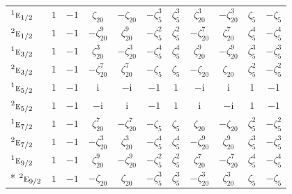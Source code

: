 \documentclass[10pt,a4paper]{article}
\makeatletter
\def\grouprule#1#2{\noalign{\marks\LTgroupmarks{\the\belowrulesep}\nobreak\vskip#1%
  \vskip\aboverulesep}\multispan\LT@cols\unskip{\leaders\hrule\@height#2\hfill\kern\z@}\cr
  \noalign{\penalty\LTrulebreak\vskip\belowrulesep\global\@lastruleclass\z@}}
\numberwithin{equation}{section}
\newcommand{\irr}[1]{\text{\normalfont\scshape #1}}
\newcommand{\conjpair}[1]{{}^{#1}}
\newcommand{\iunit}{\mathrm{i}}
\newcommand{\rootunity}[1]{\zeta_{#1}}
\makeatother
\begin{document}
{\begin{longtable}{@{}lcccccccccc@{}}
\grouprule{0pt}{\lightrulewidth}
$\conjpair{1}\irr{e}_{1/2}$ & $1$ & $-1$ & $\rootunity{20}$ & $-\rootunity{20}$ & $-\rootunity{5}^{3}$ & $\rootunity{5}^{3}$ & $\rootunity{20}^{3}$ & $-\rootunity{20}^{3}$ & $\rootunity{5}$ & $-\rootunity{5}$\\
$\conjpair{2}\irr{e}_{1/2}$ & $1$ & $-1$ & $-\rootunity{20}^{9}$ & $\rootunity{20}^{9}$ & $-\rootunity{5}^{2}$ & $\rootunity{5}^{2}$ & $-\rootunity{20}^{7}$ & $\rootunity{20}^{7}$ & $\rootunity{5}^{4}$ & $-\rootunity{5}^{4}$\\
$\conjpair{1}\irr{e}_{3/2}$ & $1$ & $-1$ & $\rootunity{20}^{3}$ & $-\rootunity{20}^{3}$ & $-\rootunity{5}^{4}$ & $\rootunity{5}^{4}$ & $\rootunity{20}^{9}$ & $-\rootunity{20}^{9}$ & $\rootunity{5}^{3}$ & $-\rootunity{5}^{3}$\\
$\conjpair{2}\irr{e}_{3/2}$ & $1$ & $-1$ & $-\rootunity{20}^{7}$ & $\rootunity{20}^{7}$ & $-\rootunity{5}$ & $\rootunity{5}$ & $-\rootunity{20}$ & $\rootunity{20}$ & $\rootunity{5}^{2}$ & $-\rootunity{5}^{2}$\\
$\conjpair{1}\irr{e}_{5/2}$ & $1$ & $-1$ & $\iunit{}$ & $-\iunit{}$ & $-1$ & $1$ & $-\iunit{}$ & $\iunit{}$ & $1$ & $-1$\\
$\conjpair{2}\irr{e}_{5/2}$ & $1$ & $-1$ & $-\iunit{}$ & $\iunit{}$ & $-1$ & $1$ & $\iunit{}$ & $-\iunit{}$ & $1$ & $-1$\\
$\conjpair{1}\irr{e}_{7/2}$ & $1$ & $-1$ & $\rootunity{20}^{7}$ & $-\rootunity{20}^{7}$ & $-\rootunity{5}$ & $\rootunity{5}$ & $\rootunity{20}$ & $-\rootunity{20}$ & $\rootunity{5}^{2}$ & $-\rootunity{5}^{2}$\\
$\conjpair{2}\irr{e}_{7/2}$ & $1$ & $-1$ & $-\rootunity{20}^{3}$ & $\rootunity{20}^{3}$ & $-\rootunity{5}^{4}$ & $\rootunity{5}^{4}$ & $-\rootunity{20}^{9}$ & $\rootunity{20}^{9}$ & $\rootunity{5}^{3}$ & $-\rootunity{5}^{3}$\\
$\conjpair{1}\irr{e}_{9/2}$ & $1$ & $-1$ & $\rootunity{20}^{9}$ & $-\rootunity{20}^{9}$ & $-\rootunity{5}^{2}$ & $\rootunity{5}^{2}$ & $\rootunity{20}^{7}$ & $-\rootunity{20}^{7}$ & $\rootunity{5}^{4}$ & $-\rootunity{5}^{4}$\\*
$\conjpair{2}\irr{e}_{9/2}$ & $1$ & $-1$ & $-\rootunity{20}$ & $\rootunity{20}$ & $-\rootunity{5}^{3}$ & $\rootunity{5}^{3}$ & $-\rootunity{20}^{3}$ & $\rootunity{20}^{3}$ & $\rootunity{5}$ & $-\rootunity{5}$\\
\bottomrule\end{longtable}}
\end{document}
